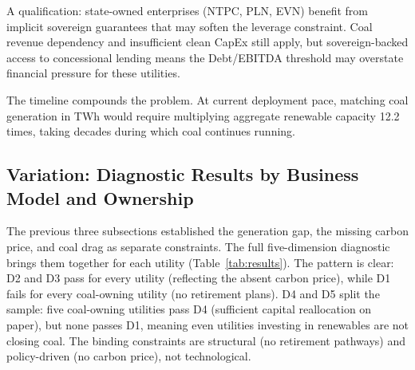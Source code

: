 \documentclass[review,3p,authoryear]{elsarticle}
\begin{document}
A qualification: state-owned enterprises (NTPC, PLN, EVN) benefit from implicit sovereign guarantees that may soften the leverage constraint. Coal revenue dependency and insufficient clean CapEx still apply, but sovereign-backed access to concessional lending means the Debt/EBITDA threshold may overstate financial pressure for these utilities.

The timeline compounds the problem. At current deployment pace, matching coal generation in TWh would require multiplying aggregate renewable capacity 12.2 times, taking decades during which coal continues running.


\subsection{Variation: Diagnostic Results by Business Model and Ownership}
\label{sec:results_ratings}

The previous three subsections established the generation gap, the missing carbon price, and coal drag as separate constraints. The full five-dimension diagnostic brings them together for each utility (Table~\ref{tab:results}). The pattern is clear: D2 and D3 pass for every utility (reflecting the absent carbon price), while D1 fails for every coal-owning utility (no retirement plans). D4 and D5 split the sample: five coal-owning utilities pass D4 (sufficient capital reallocation on paper), but none passes D1, meaning even utilities investing in renewables are not closing coal. The binding constraints are structural (no retirement pathways) and policy-driven (no carbon price), not technological.
\end{document}
